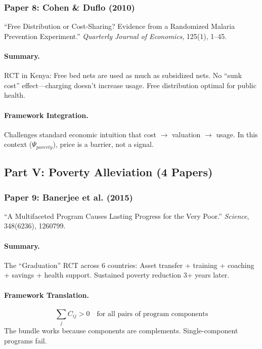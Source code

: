 \subsubsection{Paper 8: Cohen \& Duflo (2010)}

``Free Distribution or Cost-Sharing? Evidence from a Randomized Malaria Prevention Experiment.''
\textit{Quarterly Journal of Economics}, 125(1), 1--45.

\paragraph{Summary.}
RCT in Kenya: Free bed nets are used as much as subsidized nets. No ``sunk cost''
effect---charging doesn't increase usage. Free distribution optimal for public health.

\paragraph{Framework Integration.}
Challenges standard economic intuition that cost $\rightarrow$ valuation $\rightarrow$ usage.
In this context ($\Psi_{poverty}$), price is a barrier, not a signal.

\subsection{Part V: Poverty Alleviation (4 Papers)}

\subsubsection{Paper 9: Banerjee et al. (2015)}

``A Multifaceted Program Causes Lasting Progress for the Very Poor.''
\textit{Science}, 348(6236), 1260799.

\paragraph{Summary.}
The ``Graduation'' RCT across 6 countries: Asset transfer + training + coaching +
savings + health support. Sustained poverty reduction 3+ years later.

\paragraph{Framework Translation.}
\begin{equation}
  \sum_j C_{ij} > 0 \quad \text{for all pairs of program components}
\end{equation}
The bundle works because components are complements. Single-component programs fail.

